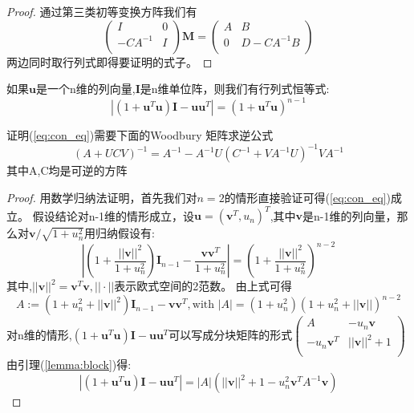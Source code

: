 \begin{proof}
通过第三类初等变换方阵我们有\[
\left(\begin{array}{cc}
I&0\\
-CA^{-1}&I\\
\end{array}\right) \bm{M}=\left(\begin{array}{cc}
A&B\\
0&D-CA^{-1}B\\
\end{array}\right)\]
两边同时取行列式即得要证明的式子。
\end{proof}
\begin{lemma}
如果$\bm{u}$是一个n维的列向量,$\bm{I}$是n维单位阵，则我们有行列式恒等式:
\begin{equation}\label{eq:con_eq}
|(1+\bm{u}^T\bm{u})\bm{I}-\bm{u}\bm{u}^T|=(1+\bm{u}^T\bm{u})^{n-1}
\end{equation}
\end{lemma}
证明(\ref{eq:con_eq})需要下面的Woodbury 矩阵求逆公式
\begin{equation}\label{eq:woodbury}
(A+UCV)^{-1}=A^{-1}-A^{-1}U(C^{-1}+VA^{-1}U)^{-1}VA^{-1}
\end{equation}
其中A,C均是可逆的方阵


\begin{proof}
用数学归纳法证明，首先我们对$n=2$的情形直接验证可得(\ref{eq:con_eq})成立。
假设结论对n-1维的情形成立，设$\bm{u}=(\bm{v}^T,u_n)^T$,其中$\bm{v}$是n-1维的列向量，那么对$\bm{v}/\sqrt{1+u_n^2}$用归纳假设有:
\begin{equation}
|(1+\frac{||\bm{v}||^2}{1+u_n^2})\bm{I}_{n-1}-\frac{\bm{v}\bm{v}^T}{1+u_n^2}|=(1+\frac{||\bm{v}||^2}{1+u_n^2})^{n-2}
\end{equation}
其中,$||\bm{v}||^2=\bm{v}^T\bm{v},||\cdot||$表示欧式空间的2范数。
由上式可得
\begin{equation}
A:=(1+u_n^2+||\bm{v}||^2)\bm{I}_{n-1}-\bm{v}\bm{v}^T,\text{with }|A|=(1+u_n^2)(1+u_n^2+||\bm{v}||)^{n-2}
\end{equation}
对n维的情形,$(1+\bm{u}^T\bm{u})\bm{I}-\bm{u}\bm{u}^T$可以写成分块矩阵的形式$\left(\begin{array}{cc}
A&-u_n\bm{v}\\
-u_n\bm{v}^T&||\bm{v}||^2+1\\
\end{array}\right)$
由引理(\ref{lemma:block})得:
\begin{equation}\label{eq:LMidd}
|(1+\bm{u}^T\bm{u})\bm{I}-\bm{u}\bm{u}^T|=|A|(||\bm{v}||^2+1-u_n^2 \bm{v}^TA^{-1}\bm{v})
\end{equation}
\end{proof}


